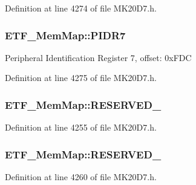 Definition at line 4274 of file M\+K20\+D7.\+h.

\subsubsection[{\texorpdfstring{P\+I\+D\+R7}{PIDR7}}]{ E\+T\+F\+\_\+\+Mem\+Map\+::\+P\+I\+D\+R7}\hypertarget{struct_e_t_f___mem_map_a53393d8ce48a43bed1d5568561776a5c}{}\label{struct_e_t_f___mem_map_a53393d8ce48a43bed1d5568561776a5c}
Peripheral Identification Register 7, offset\+: 0x\+F\+DC 

Definition at line 4275 of file M\+K20\+D7.\+h.

\subsubsection[{\texorpdfstring{R\+E\+S\+E\+R\+V\+E\+D\+\_\+0}{RESERVED_0}}]{ E\+T\+F\+\_\+\+Mem\+Map\+::\+R\+E\+S\+E\+R\+V\+E\+D\+\_}\hypertarget{struct_e_t_f___mem_map_ab16885d51713a1a31348e305c0c2e66d}{}\label{struct_e_t_f___mem_map_ab16885d51713a1a31348e305c0c2e66d}


Definition at line 4255 of file M\+K20\+D7.\+h.

\subsubsection[{\texorpdfstring{R\+E\+S\+E\+R\+V\+E\+D\+\_\+1}{RESERVED_1}}]{ E\+T\+F\+\_\+\+Mem\+Map\+::\+R\+E\+S\+E\+R\+V\+E\+D\+\_}\hypertarget{struct_e_t_f___mem_map_a38b3c3aa17a376b5b6d4010096034d9d}{}\label{struct_e_t_f___mem_map_a38b3c3aa17a376b5b6d4010096034d9d}


Definition at line 4260 of file M\+K20\+D7.\+h.


